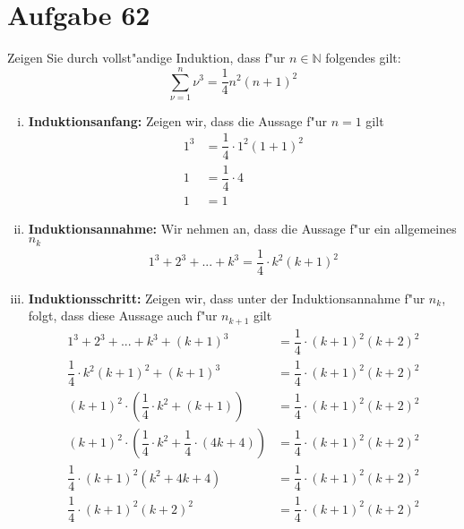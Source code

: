 \section{Aufgabe 62}

Zeigen Sie durch vollst"andige Induktion, dass f"ur $n \in \mathbb{N}$ folgendes gilt:
\begin{equation*}
    \sum_{\nu = 1}^n\nu^3 = \dfrac{1}{4}n^2(n + 1)^2
\end{equation*}
\begin{enumerate}[i)]
    \item \textbf{Induktionsanfang:} Zeigen wir, dass die Aussage f"ur $n = 1$ gilt
        \begin{align*}
            1^3 &= \dfrac{1}{4} \cdot 1^2(1 + 1)^2 \\[5pt]
            1 &= \dfrac{1}{4} \cdot 4 \\[5pt]
            1 &= 1
        \end{align*}
    \item \textbf{Induktionsannahme:} Wir nehmen an, dass die Aussage f"ur ein allgemeines $n_k$
        \begin{align*}
            1^3 + 2^3 + ... + k^3 = \dfrac{1}{4} \cdot k^2(k + 1)^2
        \end{align*}
    \item \textbf{Induktionsschritt:} Zeigen wir, dass unter der
        Induktionsannahme f"ur $n_k$, folgt, dass diese Aussage auch f"ur $n_{k
        + 1}$ gilt
        \begin{align*}
            1^3 + 2^3 + ... + k^3 + (k + 1)^3 &= \dfrac{1}{4} \cdot (k + 1)^2(k + 2)^2 \\[5pt]
            \dfrac{1}{4} \cdot k^2(k + 1)^2 + (k + 1)^3 &= \dfrac{1}{4} \cdot (k + 1)^2(k + 2)^2 \\[5pt]
            (k + 1)^2 \cdot \left(\dfrac{1}{4} \cdot k^2 + (k + 1)\right) &= \dfrac{1}{4} \cdot (k + 1)^2(k + 2)^2 \\[5pt]
            (k + 1)^2 \cdot \left(\dfrac{1}{4} \cdot k^2 + \dfrac{1}{4} \cdot (4k + 4)\right) &= \dfrac{1}{4} \cdot (k + 1)^2(k + 2)^2 \\[5pt]
            \dfrac{1}{4} \cdot (k + 1)^2 (k^2 + 4k + 4) &= \dfrac{1}{4} \cdot (k + 1)^2(k + 2)^2 \\[5pt]
            \dfrac{1}{4} \cdot (k + 1)^2 (k + 2)^2 &= \dfrac{1}{4} \cdot (k + 1)^2(k + 2)^2 \\[5pt]
        \end{align*}
\end{enumerate}
